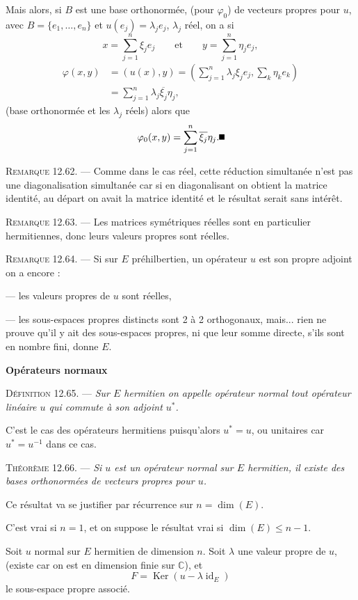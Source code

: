 Mais alors, si $B$ est une base orthonormée, (pour $\varphi_0$) de vecteurs propres pour $u$, avec $B=\{e_1,\ldots,e_n\}$ et $u(e_j)=\lambda_je_j$, $\lambda_j$ réel, on a si
\[
x=\sum_{j=1}^n\xi_je_j\qquad\text{et}\qquad y=\sum_{j=1}^n\eta_je_j,
\]
\begin{align*}
\varphi(x,y)&=(u(x),y)
=\left(\sum_{j=1}^n\lambda_j\xi_je_j,\sum_k\eta_ke_k\right)\\
&=\sum_{j=1}^n\lambda_j\overline{\xi_j}\eta_j,
\end{align*}
(base orthonormée et les $\lambda_j$ réels) alors que
\[
\varphi_0(x,y)=\sum_{j=1}^n\overline{\xi_j}\eta_j. \bookend
\]

\medskip\noindent\textsc{Remarque 12.62.} --- Comme dans le cas réel, cette réduction simultanée n'est pas une diagonalisation simultanée car si en diagonalisant on obtient la matrice identité, au départ on avait la matrice identité et le résultat serait sans intérêt.

\medskip\noindent\textsc{Remarque 12.63.} --- Les matrices symétriques réelles sont en particulier hermitiennes, donc leurs valeurs propres sont réelles.

\medskip\noindent\textsc{Remarque 12.64.} --- Si sur $E$ préhilbertien, un opérateur $u$ est son propre adjoint on a encore :

--- les valeurs propres de $u$ sont réelles,

--- les sous-espaces propres distincts sont 2 à 2 orthogonaux, mais... rien ne prouve qu'il y ait des sous-espaces propres, ni que leur somme directe, s'ils sont en nombre fini, donne $E$.

\medskip\noindent\textbf{Opérateurs normaux}

\medskip\noindent\textsc{Définition 12.65.} --- \emph{Sur $E$ hermitien on appelle opérateur normal tout opérateur linéaire $u$ qui commute à son adjoint $u^*$.}

C'est le cas des opérateurs hermitiens puisqu'alors $u^*=u$, ou unitaires car $u^*=u^{-1}$ dans ce cas.

\medskip\noindent\textsc{Théorème 12.66.} --- \emph{Si $u$ est un opérateur normal sur $E$ hermitien, il existe des bases orthonormées de vecteurs propres pour $u$.}

Ce résultat va se justifier par récurrence sur $n=\dim(E)$.

C'est vrai si $n=1$, et on suppose le résultat vrai si $\dim(E)\le n-1$.

Soit $u$ normal sur $E$ hermitien de dimension $n$. Soit $\lambda$ une valeur propre de $u$, (existe car on est en dimension finie sur $\mathbb C$), et
\[
F=\operatorname{Ker}(u-\lambda\operatorname{id}_E)
\]
le sous-espace propre associé.

